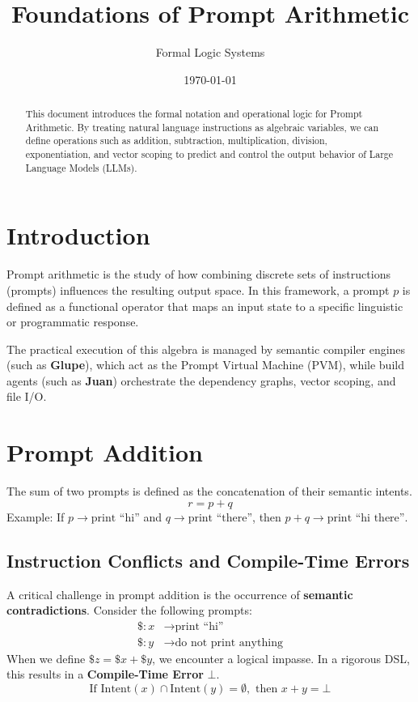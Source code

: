 \documentclass[11pt, a4paper]{article}
\title{Foundations of Prompt Arithmetic}
\author{Formal Logic Systems}
\date{\today}
\begin{document}
\maketitle

\begin{abstract}
This document introduces the formal notation and operational logic for Prompt Arithmetic. By treating natural language instructions as algebraic variables, we can define operations such as addition, subtraction, multiplication, division, exponentiation, and vector scoping to predict and control the output behavior of Large Language Models (LLMs).
\end{abstract}

\section{Introduction}
Prompt arithmetic is the study of how combining discrete sets of instructions (prompts) influences the resulting output space. In this framework, a prompt $p$ is defined as a functional operator that maps an input state to a specific linguistic or programmatic response. 

The practical execution of this algebra is managed by semantic compiler engines (such as \textbf{Glupe}), which act as the Prompt Virtual Machine (PVM), while build agents (such as \textbf{Juan}) orchestrate the dependency graphs, vector scoping, and file I/O.

\section{Prompt Addition}
The sum of two prompts is defined as the concatenation of their semantic intents.
$$r = p + q$$
Example: If $p \rightarrow \text{print ``hi''}$ and $q \rightarrow \text{print ``there''}$, then $p+q \rightarrow \text{print ``hi there''}$.

\subsection{Instruction Conflicts and Compile-Time Errors}
A critical challenge in prompt addition is the occurrence of \textbf{semantic contradictions}.
Consider the following prompts:
\begin{align*}
    \$: x &\rightarrow \text{print ``hi''} \\
    \$: y &\rightarrow \text{do not print anything}
\end{align*}
When we define $\$z = \$x + \$y$, we encounter a logical impasse. In a rigorous DSL, this results in a \textbf{Compile-Time Error} $\bot$.
$$ \text{If } \text{Intent}(x) \cap \text{Intent}(y) = \emptyset, \text{ then } x + y = \bot $$
\end{document}
